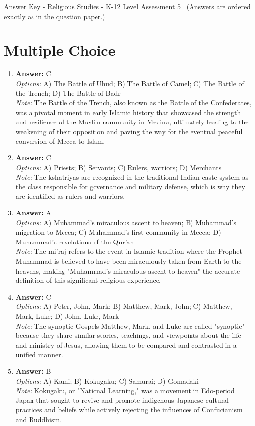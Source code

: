 \documentclass[12pt]{article}
\begin{document}
\begin{center}
Answer Key - Religious Studies - K-12 Level Assessment 5 \
\small (Answers are ordered exactly as in the question paper.)
\end{center}

\section*{Multiple Choice}
\begin{enumerate}[label=\arabic*.]
\item \textbf{Answer:} C
\\ \textit{Options:} A) The Battle of Uhud; B) The Battle of Camel; C) The Battle of the Trench; D) The Battle of Badr
\\ \textit{Note:} The Battle of the Trench, also known as the Battle of the Confederates, was a pivotal moment in early Islamic history that showcased the strength and resilience of the Muslim community in Medina, ultimately leading to the weakening of their opposition and paving the way for the eventual peaceful conversion of Mecca to Islam.
\item \textbf{Answer:} C
\\ \textit{Options:} A) Priests; B) Servants; C) Rulers, warriors; D) Merchants
\\ \textit{Note:} The kshatriyas are recognized in the traditional Indian caste system as the class responsible for governance and military defense, which is why they are identified as rulers and warriors.
\item \textbf{Answer:} A
\\ \textit{Options:} A) Muhammad's miraculous ascent to heaven; B) Muhammad's migration to Mecca; C) Muhammad's first community in Mecca; D) Muhammad's revelations of the Qur'an
\\ \textit{Note:} The mi'raj refers to the event in Islamic tradition where the Prophet Muhammad is believed to have been miraculously taken from Earth to the heavens, making "Muhammad's miraculous ascent to heaven" the accurate definition of this significant religious experience.
\item \textbf{Answer:} C
\\ \textit{Options:} A) Peter, John, Mark; B) Matthew, Mark, John; C) Matthew, Mark, Luke; D) John, Luke, Mark
\\ \textit{Note:} The synoptic Gospels-Matthew, Mark, and Luke-are called "synoptic" because they share similar stories, teachings, and viewpoints about the life and ministry of Jesus, allowing them to be compared and contrasted in a unified manner.
\item \textbf{Answer:} B
\\ \textit{Options:} A) Kami; B) Kokugaku; C) Samurai; D) Gomadaki
\\ \textit{Note:} Kokugaku, or "National Learning," was a movement in Edo-period Japan that sought to revive and promote indigenous Japanese cultural practices and beliefs while actively rejecting the influences of Confucianism and Buddhism.
\end{enumerate}
\end{document}
